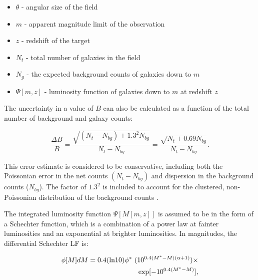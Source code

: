 \documentclass{emulateapj}
\begin{document}
\begin{itemize}
	\item $\theta$ - angular size of the field
	\item $m$ - apparent magnitude limit of the observation
	\item $z$ - redshift of the target
	\item $N_t$ - total number of galaxies in the field
	\item $N_g$ - the expected background counts of galaxies down to $m$
	\item $\Psi[m,z]$ - luminosity function of galaxies down to $m$ at redshift $z$
\end{itemize}

The uncertainty in a value of $B$ can also be calculated as a function of the total number of background and galaxy counts:

\begin{equation}
\label{eqn-deltab}
\frac{\Delta B}{B} = \frac{\sqrt{(N_t - N_{bg}) + 1.3^2 N_{bg}}}{N_t - N_{bg}} = \frac{\sqrt{N_t + 0.69 N_{bg}}}{N_t - N_{bg}}.
\end{equation}

\noindent This error estimate is considered to be conservative, including both the Poissonian error in the net counts $(N_t - N_{bg})$ and dispersion in the background counts ($N_{bg}$). The factor of $1.3^2$ is included to account for the clustered, non-Poissonian distribution of the background counts \citep{yee99}. 


The integrated luminosity function $\Psi[M[m,z]]$ is assumed to be in the form of a Schechter function, which is a combination of a power law at fainter luminosities and an exponential at brighter luminosities. In magnitudes, the differential Schechter LF is:

\begin{eqnarray}
\label{eqn-schechter}
\phi[M] dM = 0.4 ({\rm ln} 10) \phi^*~(10^{0.4(M^* - M)(\alpha + 1)}) \times \nonumber \\
{\rm exp}[-10^{0.4(M^*-M)}],
\end{eqnarray}
\end{document}
